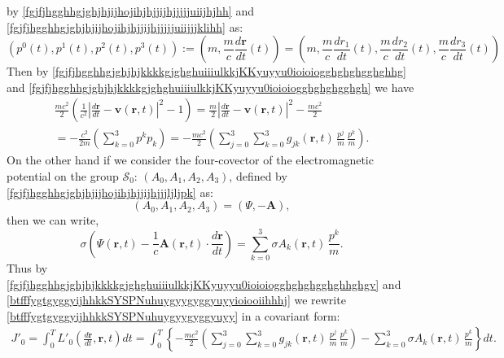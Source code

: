 \documentclass{article}
\theoremstyle{definition}
\theoremstyle{remark}
\renewcommand{\vec}[1]{\mathbf{#1}}
\newcommand{\er}{\eqref}
\newcommand{\er}{\eqref}
\begin{document}
by \er{fgjfjhgghhgjghjhjijhojihjhjjijhjjjjjuiijhjhh} and
\er{fgjfjhgghhgjghjhjijhojihjhjjijhjjjjjuiijjjklihh} as:
\begin{equation}\label{fgjfjhgghhgjghjhjijhojihjhjjijhjjjjjuiijhjhhioi}
\left(
p^0(t),p^1(t),p^2(t),p^3(t)\right):=\left(m,\frac{m}{c}\frac{d\vec
r}{dt}(t)\right)=
\left(m,\frac{m}{c}\frac{dr_1}{dt}(t),\frac{m}{c}\frac{dr_2}{dt}(t),\frac{m}{c}\frac{dr_3}{dt}(t)\right)
\end{equation}
Then by
\er{fgjfjhgghhgjghjhjkkkkgjghghuiiiulkkjKKyuyyu0ioioiogghghghgghghhg}
and
\er{fgjfjhgghhgjghjhjkkkkgjghghuiiiulkkjKKyuyyu0ioioiogghghghgghgh}
we have
\begin{multline}\label{fgjfjhgghhgjghjhjkkkkgjghghuiiiulkkjKKyuyyu0ioioiogghghghgghghhghgv}
\frac{mc^2}{2}\left(\frac{1}{c^2}\left|\frac{d\vec r}{dt}-\vec
v(\vec r,t)\right|^2-1\right)=\frac{m}{2}\left|\frac{d\vec
r}{dt}-\vec v(\vec
r,t)\right|^2-\frac{mc^2}{2}\\=-\frac{c^2}{2m}\left(\sum_{k=0}^{3}p^kp_k\right)=-\frac{mc^2}{2}\left(\sum_{j=0}^{3}\sum_{k=0}^{3}g_{jk}(\vec
r,t)\,\frac{p^j}{m}\,\frac{p^k}{m}\right).
\end{multline}
On the other hand if we consider the four-covector of the
electromagnetic potential on the group $\mathcal{S}_0$:
$(A_0,A_1,A_2,A_3)$, defined by
\er{fgjfjhgghhgjghjhjijhojihjhjjijhjjjljljpk} as:
\begin{equation}\label{fgjfjhgghhgjghjhjijhojihjhjjijhjjjljljpkyuuyyuhhhhj}
(A_0,A_1,A_2,A_3)=(\Psi,-\vec A),
\end{equation}
then we can write,
\begin{equation}\label{btfffygtgyggyijhhkkSYSPNuhuygyygyggyuyyioiooiihhhj}
\sigma\left(\Psi(\vec r,t)-\frac{1}{c}\vec A(\vec
r,t)\cdot\frac{d\vec r}{dt}\right)=\sum_{k=0}^{3}\sigma A_k(\vec
r,t)\,\frac{p^k}{m}.
\end{equation}
Thus by
\er{fgjfjhgghhgjghjhjkkkkgjghghuiiiulkkjKKyuyyu0ioioiogghghghgghghhghgv}
and \er{btfffygtgyggyijhhkkSYSPNuhuygyygyggyuyyioiooiihhhj} we
rewrite \er{btfffygtgyggyijhhkkSYSPNuhuygyygyggyuyy} in a covariant
form:
\begin{multline}\label{btfffygtgyggyijhhkkSYSPNuhuygyygyggyuyyuyuy}
J'_0=\int_0^T L'_0\left(\frac{d\vec r}{dt},\vec r,t\right)dt=
\int_0^T\left\{-\frac{mc^2}{2}\left(\sum_{j=0}^{3}\sum_{k=0}^{3}g_{jk}(\vec
r,t)\,\frac{p^j}{m}\,\frac{p^k}{m}\right)-\sum_{k=0}^{3}\sigma
A_k(\vec r,t)\,\frac{p^k}{m}\right\}dt.
\end{multline}
\end{document}
